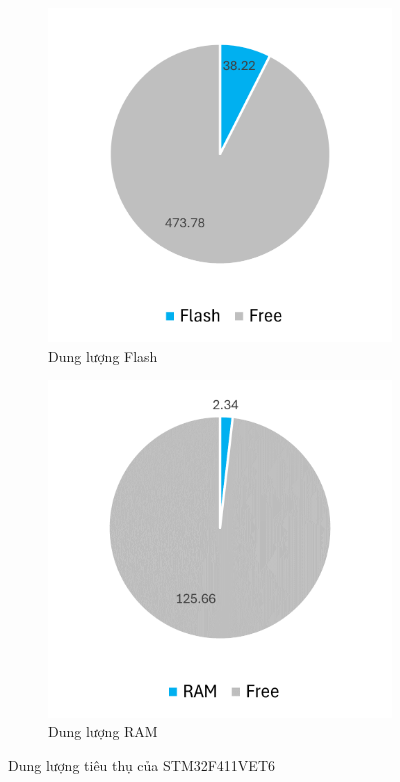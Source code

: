 \begin{figure}[H]
\centering
\begin{subfigure}[b]{0.495\textwidth} 
         \centering
         \includegraphics[width=\textwidth]{images/stm32flash.png}
         \caption{Dung lượng Flash}
\end{subfigure}
\hfill
\begin{subfigure}[b]{0.495\textwidth}
         \centering
         \includegraphics[width=\textwidth]{images/stm32ram.png}
         \caption{Dung lượng RAM}
\end{subfigure}
\caption{Dung lượng tiêu thụ của STM32F411VET6}
\label{fig:stm32mem}
\end{figure}

